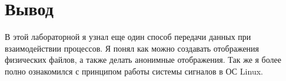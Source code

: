 \section{Вывод}

В этой лабораторной я узнал еще один способ передачи данных при взаимодействии процессов. Я понял как можно создавать отображения физических файлов, а также делать анонимные отображения. Так же я более полно ознакомился с принципом работы системы сигналов в ОС Linux.
